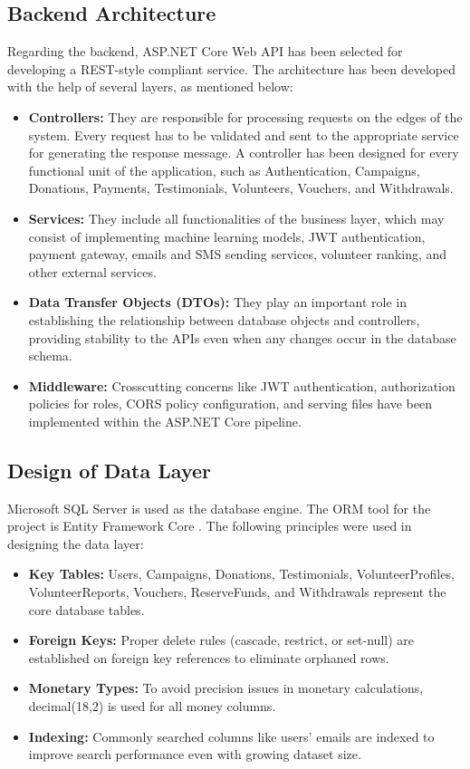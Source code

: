 \documentclass{thesis-library}
\begin{document}
\subsection{Backend Architecture}
Regarding the backend, ASP.NET Core Web API has been selected for developing a REST-style compliant service. The architecture has been developed with the help of several layers, as mentioned below:
\begin{itemize}
    \item \textbf{Controllers:} They are responsible for processing requests on the edges of the system. Every request has to be validated and sent to the appropriate service for generating the response message. A controller has been designed for every functional unit of the application, such as Authentication, Campaigns, Donations, Payments, Testimonials, Volunteers, Vouchers, and Withdrawals.
    \item \textbf{Services:} They include all functionalities of the business layer, which may consist of implementing machine learning models, JWT authentication, payment gateway, emails and SMS sending services, volunteer ranking, and other external services.
    \item \textbf{Data Transfer Objects (DTOs):} They play an important role in establishing the relationship between database objects and controllers, providing stability to the APIs even when any changes occur in the database schema.
    \item \textbf{Middleware:} Crosscutting concerns like JWT authentication, authorization policies for roles, CORS policy configuration, and serving files have been implemented within the ASP.NET Core pipeline.
\end{itemize}

\subsection{Design of Data Layer}
Microsoft SQL Server is used as the database engine. The ORM tool for the project is Entity Framework Core \cite{lerman2020efcore,coronel2016database}. The following principles were used in designing the data layer:
\begin{itemize}
    \item \textbf{Key Tables:} Users, Campaigns, Donations, Testimonials, VolunteerProfiles, VolunteerReports, Vouchers, ReserveFunds, and Withdrawals represent the core database tables.
    \item \textbf{Foreign Keys:} Proper delete rules (cascade, restrict, or set-null) are established on foreign key references to eliminate orphaned rows.
    \item \textbf{Monetary Types:} To avoid precision issues in monetary calculations, decimal(18,2) is used for all money columns.
    \item \textbf{Indexing:} Commonly searched columns like users' emails are indexed to improve search performance even with growing dataset size.
\end{itemize}
\end{document}
